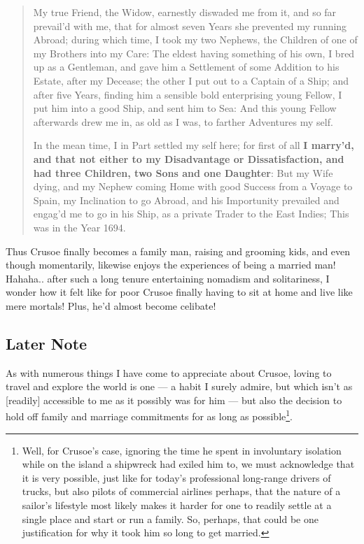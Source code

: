 \documentclass[a4paper]{article}
\begin{document}
\noindent
\begin{minipage}{1\textwidth}
\vspace{1em}
\begin{quotation}
{\ttfamily


My true Friend, the Widow, earnestly diswaded me from it, and so far prevail’d with me, that for almost seven Years she prevented my running Abroad; during which time, I took my two Nephews, the Children of one of my Brothers into my Care: The eldest having something of his own, I bred up as a Gentleman, and gave him a Settlement of some Addition to his Estate, after my Decease; the other I put out to a Captain of a Ship; and after five Years, finding him a sensible bold enterprising young Fellow, I put him into a good Ship, and sent him to Sea: And this young Fellow afterwards drew me in, as old as I was, to farther Adventures my self.

In the mean time, I in Part settled my self here; for first of all \textbf{I marry’d, and that not either to my Disadvantage or Dissatisfaction, and had three Children, two Sons and one Daughter}: But my Wife dying, and my Nephew coming Home with good Success from a Voyage to Spain, my Inclination to go Abroad, and his Importunity prevailed and engag'd me to go in his Ship, as a private Trader to the East Indies; This was in the Year 1694. 


}
\end{quotation}
\vspace{1em}
\end{minipage}


Thus Crusoe finally becomes a family man, raising and grooming kids, and even though momentarily, likewise enjoys the experiences of being a married man! Hahaha.. after such a long tenure entertaining nomadism and solitariness, I wonder how it felt like for poor Crusoe finally having to sit at home and live like mere mortals! Plus, he'd almost become celibate!


\subsection{Later Note}

As with numerous things I have come to appreciate about Crusoe, loving to travel and explore the world is one --- a habit I surely admire, but which isn't as [readily] accessible to me as it possibly was for him --- but also the decision to hold off family and marriage commitments for as long as possible\footnote{Well, for Crusoe's case, ignoring the time he spent in involuntary isolation while on the island a shipwreck had exiled him to, we must acknowledge that it is very possible, just like for today's professional long-range drivers of trucks, but also pilots of commercial airlines perhaps, that the nature of a sailor's lifestyle most likely makes it harder for one to readily settle at a single place and start or run a family. So, perhaps, that could be one justification for why it took him so long to get married.}.
\end{document}

